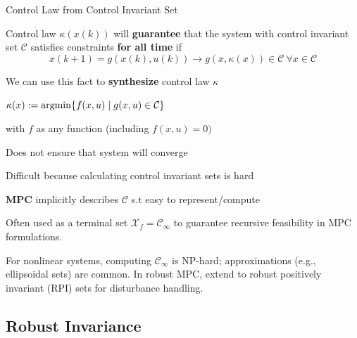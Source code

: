 \begin{sstTitleBox}[BrickRed]{
    Control Law from Control Invariant Set
  }

  \begin{sstOnlyFrame}[BrickRed]

    \begin{centering}
      Control law $\kappa(x(k))$ will \textbf{guarantee}
      that the system
      with control invariant set $\mathcal{C}$
      satisfies constraints \textbf{for all time} if
      $$x(k+1)=g(x(k),u(k))\to
      g(x,\kappa(x)) \in \mathcal{C} \ \forall x \in \mathcal{C}$$

      We can use this fact to \textbf{synthesize}
      control law $\kappa$

    \end{centering}
    \begin{sstFullFrame}[BrickRed]\color{white}
      \begin{centering}

        $\kappa(x):=\operatorname{argmin}\{f(x,u) \mid g(x,u)\in\mathcal{C}\}$

      \end{centering}
    \end{sstFullFrame}

    with $f$ as any function (including $f(x,u)=0)$
  \end{sstOnlyFrame}

  \begin{sstOnlyFrame}[BrickRed]
    Does not ensure that system will converge

    Difficult because calculating control invariant sets is hard

    \textbf{MPC} implicitly describes $\mathcal{C}$
    s.t easy to represent/compute
  \end{sstOnlyFrame}
\end{sstTitleBox}

Often used as a terminal set $\mathcal{X}_f = \mathcal{C}_\infty$ to
guarantee recursive feasibility in MPC formulations.

For nonlinear systems, computing $\mathcal{C}_\infty$ is NP-hard;
approximations (e.g., ellipsoidal sets) are common. In robust MPC,
extend to robust positively invariant (RPI) sets for disturbance handling.

\subsection{Robust Invariance}

